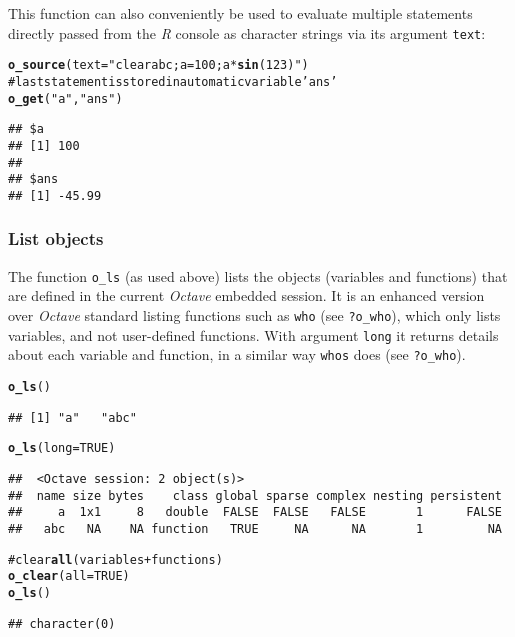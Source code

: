 \documentclass[english,10pt,a4paper]{article}\usepackage{graphicx, color}
\makeatletter
\newcommand{\hlfunctioncall}[1]{\textcolor[rgb]{0.501960784313725,0,0.329411764705882}{\textbf{#1}}}%
\newcommand{\hlstring}[1]{\textcolor[rgb]{0.6,0.6,1}{#1}}%
\newcommand{\hlcomment}[1]{\textcolor[rgb]{0.180392156862745,0.6,0.341176470588235}{#1}}%
\newenvironment{kframe}{%
 \def\at@end@of@kframe{}%
 \ifinner\ifhmode%
  \def\at@end@of@kframe{\end{minipage}}%
  \begin{minipage}{\columnwidth}%
 \fi\fi%
 \def\FrameCommand##1{\hskip\@totalleftmargin \hskip-\fboxsep
 \colorbox{shadecolor}{##1}\hskip-\fboxsep
     \hskip-\linewidth \hskip-\@totalleftmargin \hskip\columnwidth}%
 \MakeFramed {\advance\hsize-\width
   \@totalleftmargin\z@ \linewidth\hsize
   \@setminipage}}%
 {\par\unskip\endMakeFramed%
 \at@end@of@kframe}
\newenvironment{knitrout}{}{} %
\let\proglang=\textit
\let\code=\texttt
\newcommand{\R}{\proglang{R}\xspace}
\newcommand{\octave}{\proglang{Octave}\xspace}
\makeatother
\begin{document}
This function can also conveniently be used to evaluate multiple statements
directly passed from the \R console as character strings via its argument
\code{text}:

\begin{knitrout}
\color{fgcolor}\begin{kframe}
\begin{alltt}
\hlfunctioncall{o_source}(text = \hlstring{"clear a b c; a=100; a*\hlfunctioncall{sin}(123)"})
\hlcomment{# last statement is stored in automatic variable \hlstring{'ans'}}
\hlfunctioncall{o_get}(\hlstring{"a"}, \hlstring{"ans"})
\end{alltt}
\begin{verbatim}
## $a
## [1] 100
## 
## $ans
## [1] -45.99
\end{verbatim}
\end{kframe}
\end{knitrout}


\subsubsection{List objects}

The function \code{o\_ls} (as used above) lists the objects (variables and
functions) that are defined in the current \octave embedded session.
It is an enhanced version over \octave standard listing functions such as
\code{who} (see \code{?o\_who}), which only lists variables, and not
user-defined functions.
With argument \code{long} it returns details about each variable and function,
in a similar way \code{whos} does (see \code{?o\_who}).

\begin{knitrout}
\color{fgcolor}\begin{kframe}
\begin{alltt}
\hlfunctioncall{o_ls}()
\end{alltt}
\begin{verbatim}
## [1] "a"   "abc"
\end{verbatim}
\begin{alltt}
\hlfunctioncall{o_ls}(long = TRUE)
\end{alltt}
\begin{verbatim}
##  <Octave session: 2 object(s)>
##  name size bytes    class global sparse complex nesting persistent
##     a  1x1     8   double  FALSE  FALSE   FALSE       1      FALSE
##   abc   NA    NA function   TRUE     NA      NA       1         NA
\end{verbatim}
\begin{alltt}

\hlcomment{# clear \hlfunctioncall{all} (variables + functions)}
\hlfunctioncall{o_clear}(all = TRUE)
\hlfunctioncall{o_ls}()
\end{alltt}
\begin{verbatim}
## character(0)
\end{verbatim}
\end{kframe}
\end{knitrout}
\end{document}
